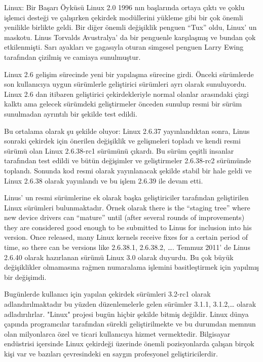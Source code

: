 \documentclass[10pt,a5paper]{book}
\begin{document}
\begin{section}{Linux: Bir Başarı Öyküsü}
Linux 2.0 1996 nın başlarında ortaya çıktı ve çoklu işlemci desteği ve çalışırken çekirdek modüllerini yükleme gibi bir çok önemli yenilikle birlikte geldi. Bir diğer önemli değişiklik penguen “Tux” oldu, Linux’ un maskotu.  Linus Torvalds Avustralya’ da bir penguenle karşılaşmış ve bundan çok etkilenmişti. Sarı ayakları ve gagasıyla oturan simgesel penguen Larry Ewing tarafından çizilmiş ve camiaya sunulmuştur.

Linux 2.6 gelişim sürecinde yeni bir yapılaşma sürecine girdi. Önceki sürümlerde son kullanıcıya uygun sürümlerle geliştirici sürümleri ayrı olarak sunuluyordu. Linux 2.6 dan itibaren geliştirici çekirdekleriyle normal olanlar arasındaki çizgi kalktı ama gelecek sürümdeki geliştirmeler önceden sunulup resmi bir sürüm sunulmadan ayrıntılı bir şekilde test edildi.

Bu ortalama olarak şu şekilde oluyor: Linux 2.6.37 yayınlandıktan sonra, Linus sonraki çekirdek için önerilen değişiklik ve gelişmeleri topladı ve kendi resmi sürümü olan Linux 2.6.38-rc1 sürümünü çıkardı. Bu sürüm çeşitli insanlar tarafından test edildi ve bütün değişimler ve geliştirmeler 2.6.38-rc2 sürümünde toplandı. Sonunda kod resmi olarak yayınlanacak şekilde stabil bir hale geldi ve Linux 2.6.38 olarak yayınlandı ve bu işlem 2.6.39 ile devam etti.

Linus’ un resmi sürümlerine ek olarak başka geliştiriciler tarafından geliştirilen Linux sürümleri bulunmaktadır. Örnek olarak there is the “staging tree” where new device drivers can “mature” until (after several rounds of improvements) they are considered good enough to be submitted to Linus for inclusion into his version. Once released, many Linux kernels receive fixes for a
certain period of time, so there can be versions like 2.6.38.1, 2.6.38.2, ….
Temmuz 2011’ de Linus 2.6.40 olarak hazırlanan sürümü Linux 3.0 olarak duyurdu. Bu çok büyük değişiklikler olmamasına rağmen numaralama işlemini basitleştirmek için yapılmış bir değişimdi.

Bugünlerde kullanıcı için yapılan çekirdek sürümleri 3.2-rc1 olarak adlandırılmaktadır bu yüzden düzenlemelerle gelen sürümler 3.1.1, 3.1.2,… olarak adladırılırlar. "Linux" projesi bugün hiçbir şekilde bitmiş değildir. Linux dünya çapında programcılar tarafından sürekli geliştirilmekte ve bu  durumdan memnun olan milyonlarca özel ve ticari kullanıcıya hizmet vermektedir. Bilgisayar endüstrisi içersinde  Linux çekirdeği üzerinde  önemli pozisyonlarda çalışan birçok kişi var ve bazıları çevresindeki en saygın profesyonel geliştiricilerdir.


\end{section}
\end{document}
